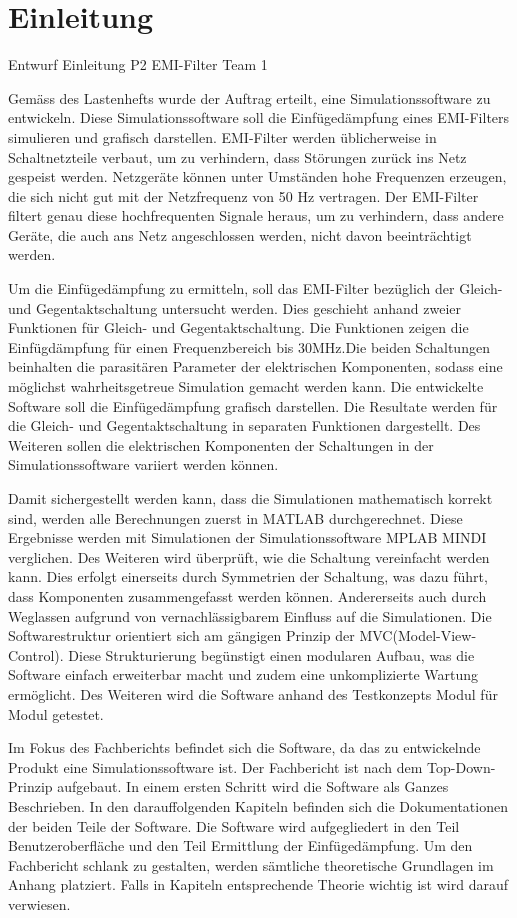 \section{Einleitung} \label{sec:einleitung}
Entwurf Einleitung P2 EMI-Filter Team 1

Gemäss des Lastenhefts wurde der Auftrag erteilt, eine Simulationssoftware zu entwickeln. Diese Simulationssoftware soll die Einfügedämpfung eines EMI-Filters simulieren und grafisch darstellen. EMI-Filter werden üblicherweise in Schaltnetzteile verbaut, um zu verhindern, dass Störungen zurück ins Netz gespeist werden. Netzgeräte können unter Umständen hohe Frequenzen erzeugen, die sich nicht gut mit der Netzfrequenz von 50 Hz vertragen. Der EMI-Filter filtert genau diese hochfrequenten Signale heraus, um zu verhindern, dass andere Geräte, die auch ans Netz angeschlossen werden, nicht davon beeinträchtigt werden.

Um die Einfügedämpfung zu ermitteln, soll das EMI-Filter bezüglich der Gleich- und Gegentaktschaltung untersucht werden. Dies geschieht anhand zweier Funktionen für Gleich- und Gegentaktschaltung. Die Funktionen zeigen die Einfügdämpfung für einen Frequenzbereich bis 30MHz.Die beiden Schaltungen beinhalten die parasitären Parameter der elektrischen Komponenten, sodass eine möglichst wahrheitsgetreue Simulation gemacht werden kann. Die entwickelte Software soll die Einfügedämpfung grafisch darstellen.  Die Resultate werden für die Gleich- und Gegentaktschaltung in separaten Funktionen dargestellt. Des Weiteren sollen die elektrischen Komponenten der Schaltungen in der Simulationssoftware variiert werden können.
 
Damit sichergestellt werden kann, dass die Simulationen mathematisch korrekt sind, werden alle Berechnungen zuerst in MATLAB durchgerechnet. Diese Ergebnisse werden mit Simulationen der Simulationssoftware MPLAB MINDI verglichen. Des Weiteren wird überprüft, wie die Schaltung vereinfacht werden kann. Dies erfolgt einerseits durch Symmetrien der Schaltung, was dazu führt, dass Komponenten zusammengefasst werden können. Andererseits auch durch Weglassen aufgrund von vernachlässigbarem Einfluss auf die Simulationen. Die Softwarestruktur orientiert sich am gängigen Prinzip der MVC(Model-View-Control). Diese Strukturierung begünstigt einen modularen Aufbau, was die Software einfach erweiterbar macht und zudem eine unkomplizierte Wartung ermöglicht. Des Weiteren wird die Software anhand des Testkonzepts Modul für Modul getestet.

Im Fokus des Fachberichts befindet sich die Software, da das zu entwickelnde Produkt eine Simulationssoftware ist. Der Fachbericht ist nach dem Top-Down-Prinzip aufgebaut. In einem ersten Schritt wird die Software als Ganzes Beschrieben. In den darauffolgenden Kapiteln befinden sich die Dokumentationen der beiden Teile der Software. Die Software wird aufgegliedert in den Teil Benutzeroberfläche und den Teil Ermittlung der Einfügedämpfung. Um den Fachbericht schlank zu gestalten, werden sämtliche theoretische Grundlagen im Anhang platziert. Falls in Kapiteln entsprechende Theorie wichtig ist wird darauf verwiesen.

